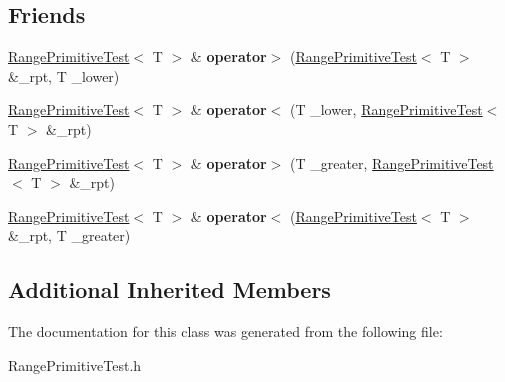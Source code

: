 \subsection*{Friends}
\begin{DoxyCompactItemize}
\item 
\mbox{\label{class_range_primitive_test_adc4b5e0edfdc33b7847e865fa9a0156f}} 
\hyperlink{class_range_primitive_test}{Range\+Primitive\+Test}$<$ T $>$ \& {\bfseries operator$>$} (\hyperlink{class_range_primitive_test}{Range\+Primitive\+Test}$<$ T $>$ \&\+\_\+rpt, T \+\_\+lower)
\item 
\mbox{\label{class_range_primitive_test_aa8ef9c7ab9cddca084117fbd68f51e43}} 
\hyperlink{class_range_primitive_test}{Range\+Primitive\+Test}$<$ T $>$ \& {\bfseries operator$<$} (T \+\_\+lower, \hyperlink{class_range_primitive_test}{Range\+Primitive\+Test}$<$ T $>$ \&\+\_\+rpt)
\item 
\mbox{\label{class_range_primitive_test_a86324f8ee9d7a253b83c767017aaec5c}} 
\hyperlink{class_range_primitive_test}{Range\+Primitive\+Test}$<$ T $>$ \& {\bfseries operator$>$} (T \+\_\+greater, \hyperlink{class_range_primitive_test}{Range\+Primitive\+Test}$<$ T $>$ \&\+\_\+rpt)
\item 
\mbox{\label{class_range_primitive_test_a60d8ecdb646db1900aa59cc3600eb8cb}} 
\hyperlink{class_range_primitive_test}{Range\+Primitive\+Test}$<$ T $>$ \& {\bfseries operator$<$} (\hyperlink{class_range_primitive_test}{Range\+Primitive\+Test}$<$ T $>$ \&\+\_\+rpt, T \+\_\+greater)
\end{DoxyCompactItemize}
\subsection*{Additional Inherited Members}


The documentation for this class was generated from the following file\+:\begin{DoxyCompactItemize}
\item 
Range\+Primitive\+Test.\+h\end{DoxyCompactItemize}
